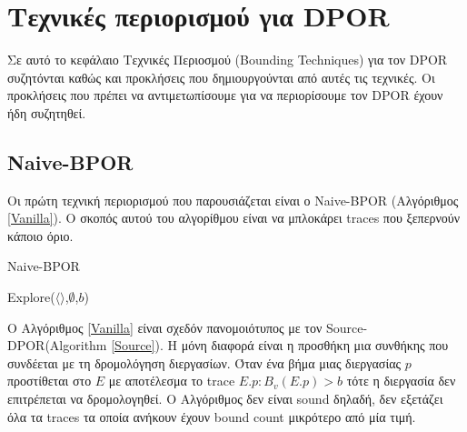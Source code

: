 \chapter{Τεχνικές περιορισμού για DPOR}
\label{bounded}

Σε αυτό το κεφάλαιο Τεχνικές Περιοσμού (Bounding Techniques) για τον DPOR συζητόνται καθώς και προκλήσεις που δημιουργούνται από αυτές τις τεχνικές.
Οι προκλήσεις που πρέπει να αντιμετωπίσουμε για να περιορίσουμε τον DPOR έχουν ήδη συζητηθεί.


\section{Naive-BPOR}

Οι πρώτη τεχνική περιορισμού που παρουσιάζεται είναι ο Naive-BPOR (Αλγόριθμος \ref{Vanilla}). Ο σκοπός αυτού του αλγορίθμου είναι να μπλοκάρει traces που ξεπερνούν κάποιο
όριο.

\begin{algorithm}
    \caption{Naive-BPOR}
    \label{Vanilla}
    Explore($\langle \rangle$,$\emptyset$,$b$)\;
\end{algorithm}

Ο Αλγόριθμος \ref{Vanilla} είναι σχεδόν πανομοιότυπος με τον  Source-DPOR(Algorithm \ref{Source}). Η μόνη διαφορά είναι η προσθήκη μια συνθήκης που συνδέεται με τη δρομολόγηση
διεργασίων. Όταν ένα βήμα μιας διεργασίας $p$ προστίθεται στο $E$ με αποτέλεσμα το  trace $E.p : B_v(E.p) > b$ τότε η διεργασία δεν επιτρέπεται να δρομολογηθεί.
Ο Αλγόριθμος δεν είναι sound δηλαδή, δεν εξετάζει όλα τα traces τα οποία ανήκουν έχουν bound count μικρότερο από μία τιμή.

